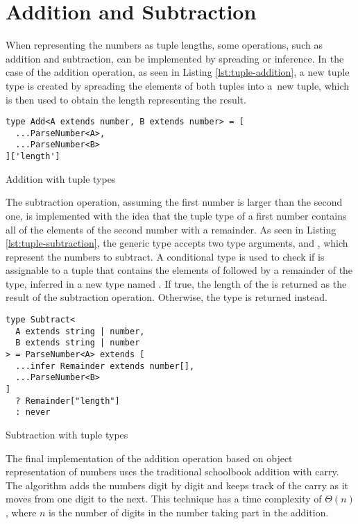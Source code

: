 \section{Addition and Subtraction}

When representing the numbers as tuple lengths, some operations, such as addition and subtraction, can be implemented by spreading or inference. In the case of the addition operation, as seen in Listing \ref{lst:tuple-addition}, a new tuple type is created by spreading the elements of both tuples into a~new tuple, which is then used to obtain the length representing the result.

\begin{listing}[ht]
  \begin{verbatim}
type Add<A extends number, B extends number> = [
  ...ParseNumber<A>, 
  ...ParseNumber<B>
]['length']
\end{verbatim}
  \caption{Addition with tuple types}\label{lst:tuple-addition}
\end{listing}

The subtraction operation, assuming the first number is larger than the second one, is implemented with the idea that the tuple type of a first number contains all of the elements of the second number with a remainder. As seen in Listing \ref{lst:tuple-subtraction}, the  generic type accepts two type arguments,  and , which represent the numbers to subtract. A conditional type is used to check if  is assignable to a tuple that contains the elements of  followed by a remainder of the  type, inferred in a new type named . If true, the length of the  is returned as the result of the subtraction operation. Otherwise, the  type is returned instead.

\begin{listing}[ht]
  \begin{verbatim}
type Subtract<
  A extends string | number,
  B extends string | number
> = ParseNumber<A> extends [
  ...infer Remainder extends number[],
  ...ParseNumber<B>
]
  ? Remainder["length"]
  : never
\end{verbatim}
  \caption{Subtraction with tuple types}\label{lst:tuple-subtraction}
\end{listing}

The final implementation of the addition operation based on object representation of numbers uses the traditional schoolbook addition with carry. The algorithm adds the numbers digit by digit and keeps track of the carry as it moves from one digit to the next. This technique has a time complexity of $\Theta(n)$, where $n$ is the number of digits in the number taking part in the addition.

